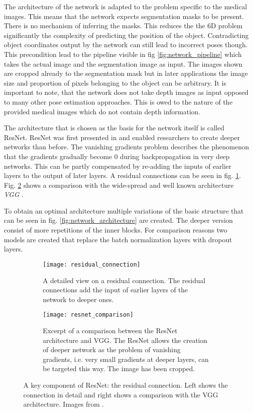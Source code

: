 The architecture of the network is adapted to the problem specific to the medical images. This means that the network expects segmentation masks to be present. There is no mechanism of inferring the masks. This reduces the the 6D problem significantly the complexity of predicting the position of the object. Contradicting object coordinates output by the network can still lead to incorrect poses though. This precondition lead to the pipeline visible in fig \ref{fig:network_pipeline} which takes the actual image and the segmentation image as input. The images shown are cropped already to the segmentation mask but in later applications the image size and proportion of pixels belonging to the object can be arbitrary. It is important to note, that the network does not take depth images as input opposed to many other pose estimation approaches. This is owed to the nature of the provided medical images which do not contain depth information.

The architecture that is chosen as the basis for the network itself is called ResNet. ResNet was first presented in \cite{resnet} and enabled researchers to create deeper networks than before. The vanishing gradients problem describes the phenomenon that the gradients gradually become 0 during backpropagation in very deep networks. This can be partly compensated by re-adding the inputs of earlier layers to the output of later layers. A residual connections can be seen in fig. \ref{fig:residual_connection}. Fig. \ref{fig:resnet_comparison} shows a comparison with the wide-spread and well known architecture \textit{VGG} \cite{vgg}.

To obtain an optimal architecture multiple variations of the basic structure that can be seen in fig. \ref{fig:network_architecture} are created. The deeper version consist of more repetitions of the inner blocks. For comparison reasons two models are created that replace the batch normalization layers with dropout layers.

\begin{figure}[!tbp]
	\centering
	\begin{subfigure}[t]{0.47\textwidth}
		\centering
    	\texttt{[image: residual\_connection]}
    	\caption{A detailed view on a residual connection. The residual connections add the input of earlier layers of the network to deeper ones.}
    	\label{fig:residual_connection}
	\end{subfigure}
	\hfill
	\begin{subfigure}[t]{0.47\textwidth}
		\centering
    	\texttt{[image: resnet\_comparison]}
    	\caption{Excerpt of a comparison between the ResNet architecture and VGG. The ResNet allows the creation of deeper network as the problem of vanishing gradients, i.e. very small gradients at deeper layers, can be targeted this way. The image has been cropped.}
    	\label{fig:resnet_comparison}
	\end{subfigure}
	\caption{A key component of ResNet: the residual connection. Left shows the connection in detail and right shows a comparison with the VGG architecture. Images from \cite{resnet}.}
	\label{fig:resnet_details}
\end{figure} 

